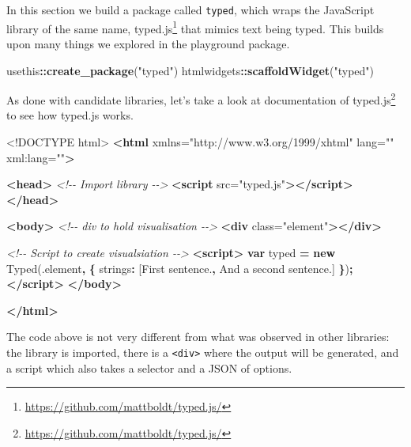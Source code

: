 \documentclass[
]{krantz}
\makeatletter
\newenvironment{Shaded}{\begin{snugshade}}{\end{snugshade}}
\newcommand{\AttributeTok}[1]{\textcolor[rgb]{0.61,0.61,0.61}{#1}}
\newcommand{\CommentTok}[1]{\textcolor[rgb]{0.37,0.37,0.37}{\textit{#1}}}
\newcommand{\DataTypeTok}[1]{\textcolor[rgb]{0.27,0.27,0.27}{#1}}
\newcommand{\KeywordTok}[1]{\textcolor[rgb]{0.27,0.27,0.27}{\textbf{#1}}}
\newcommand{\NormalTok}[1]{#1}
\newcommand{\OperatorTok}[1]{\textcolor[rgb]{0.43,0.43,0.43}{\textbf{#1}}}
\newcommand{\OtherTok}[1]{\textcolor[rgb]{0.37,0.37,0.37}{#1}}
\newcommand{\StringTok}[1]{\textcolor[rgb]{0.5,0.5,0.5}{#1}}
\renewcommand{\href}[2]{#2\footnote{\url{#1}}}
\newenvironment{kframe}{%
\medskip{}
\setlength{\fboxsep}{.8em}
 \def\at@end@of@kframe{}%
 \ifinner\ifhmode%
  \def\at@end@of@kframe{\end{minipage}}%
  \begin{minipage}{\columnwidth}%
 \fi\fi%
 \def\FrameCommand##1{\hskip\@totalleftmargin \hskip-\fboxsep
 \colorbox{shadecolor}{##1}\hskip-\fboxsep
     \hskip-\linewidth \hskip-\@totalleftmargin \hskip\columnwidth}%
 \MakeFramed {\advance\hsize-\width
   \@totalleftmargin\z@ \linewidth\hsize
   \@setminipage}}%
 {\par\unskip\endMakeFramed%
 \at@end@of@kframe}
\renewenvironment{Shaded}{\begin{kframe}}{\end{kframe}}
\makeatother
\begin{document}
In this section we build a package called \texttt{typed}, which wraps the JavaScript library of the same name, \href{https://github.com/mattboldt/typed.js/}{typed.js} that mimics text being typed. This builds upon many things we explored in the playground package.

\begin{Shaded}
\begin{Highlighting}[]
\NormalTok{usethis}\OperatorTok{::}\KeywordTok{create\_package}\NormalTok{(}\StringTok{"typed"}\NormalTok{)}
\NormalTok{htmlwidgets}\OperatorTok{::}\KeywordTok{scaffoldWidget}\NormalTok{(}\StringTok{"typed"}\NormalTok{)}
\end{Highlighting}
\end{Shaded}

As done with candidate libraries, let's take a look at documentation of \href{https://github.com/mattboldt/typed.js/}{typed.js} to see how typed.js works.

\begin{Shaded}
\begin{Highlighting}[]
\DataTypeTok{<!DOCTYPE }\NormalTok{html}\DataTypeTok{>}
\KeywordTok{<html}\OtherTok{ xmlns=}\StringTok{"http://www.w3.org/1999/xhtml"}\OtherTok{ lang=}\StringTok{""}\OtherTok{ xml:lang=}\StringTok{""}\KeywordTok{>}

\KeywordTok{<head>}
  \CommentTok{<!{-}{-} Import library {-}{-}>}
  \KeywordTok{<script}\OtherTok{ src=}\StringTok{"typed.js"}\KeywordTok{></script>}
\KeywordTok{</head>}

\KeywordTok{<body>}
  \CommentTok{<!{-}{-} div to hold visualisation {-}{-}>}
  \KeywordTok{<div}\OtherTok{ class=}\StringTok{"element"}\KeywordTok{></div>}

  \CommentTok{<!{-}{-} Script to create visualsiation {-}{-}>}
  \KeywordTok{<script>}
    \KeywordTok{var}\NormalTok{ typed }\OperatorTok{=} \KeywordTok{new} \AttributeTok{Typed}\NormalTok{(}\StringTok{\textquotesingle{}.element\textquotesingle{}}\OperatorTok{,} \OperatorTok{\{}
      \DataTypeTok{strings}\OperatorTok{:}\NormalTok{ [}\StringTok{\textquotesingle{}First sentence.\textquotesingle{}}\OperatorTok{,} \StringTok{\textquotesingle{}And a second sentence.\textquotesingle{}}\NormalTok{]}
    \OperatorTok{\}}\NormalTok{)}\OperatorTok{;}
  \KeywordTok{</script>}
\KeywordTok{</body>}

\KeywordTok{</html>}
\end{Highlighting}
\end{Shaded}

The code above is not very different from what was observed in other libraries: the library is imported, there is a \texttt{\textless{}div\textgreater{}} where the output will be generated, and a script which also takes a selector and a JSON of options.
\end{document}
